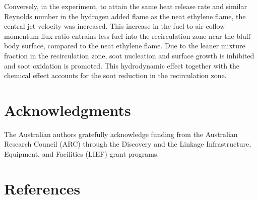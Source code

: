 \documentclass[review,3p,times]{elsarticle}
\begin{document}
Conversely, in the experiment, to attain the same \textcolor{Rv1}{heat release rate and similar }Reynolds number in the hydrogen added flame as the neat ethylene flame, the central jet velocity was increased.  This increase in the fuel to air coflow momentum flux ratio entrains less fuel into the recirculation zone near the bluff body surface, compared to the neat ethylene flame.  Due to the leaner mixture fraction in the recirculation zone, soot nucleation and surface growth is inhibited and soot oxidation is promoted.  This hydrodynamic effect together with the chemical effect accounts for the soot reduction in the recirculation zone.    

\section*{Acknowledgments}

The Australian authors gratefully acknowledge funding from the Australian Research Council (ARC) through the Discovery and the Linkage Infrastructure, Equipment, and Facilities (LIEF) grant programs.


\section*{References}



\renewcommand{\thefigure}{\arabic{figure}}
\renewcommand{\thetable}{\arabic{table}}

\clearpage
\listoffigures
\end{document}
